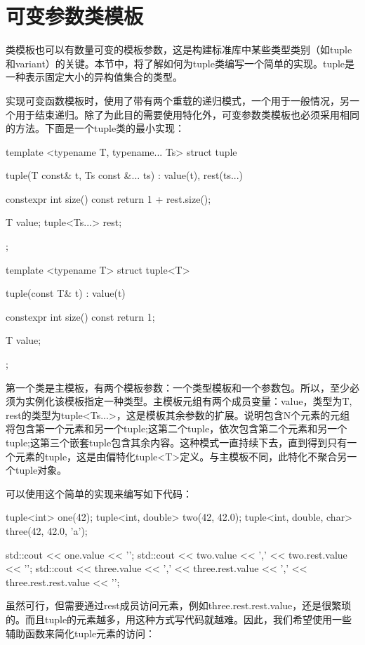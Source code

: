 \section{可变参数类模板}
类模板也可以有数量可变的模板参数，这是构建标准库中某些类型类别（如tuple和variant）的关键。本节中，将了解如何为tuple类编写一个简单的实现。tuple是一种表示固定大小的异构值集合的类型。

实现可变函数模板时，使用了带有两个重载的递归模式，一个用于一般情况，另一个用于结束递归。除了为此目的需要使用特化外，可变参数类模板也必须采用相同的方法。下面是一个tuple类的最小实现：

\begin{cpp}
template <typename T, typename... Ts>
struct tuple
{
	tuple(T const& t, Ts const &... ts)
	: value(t), rest(ts...)
	{
	}

	constexpr int size() const { return 1 + rest.size(); }
	
	T value;
	tuple<Ts...> rest;
};

template <typename T>
struct tuple<T>
{
	tuple(const T& t)
	: value(t)
	{
	}

	constexpr int size() const { return 1; }
	
	T value;
};
\end{cpp}

第一个类是主模板，有两个模板参数：一个类型模板和一个参数包。所以，至少必须为实例化该模板指定一种类型。主模板元组有两个成员变量：value，类型为T, rest的类型为tuple<Ts...>，这是模板其余参数的扩展。说明包含N个元素的元组将包含第一个元素和另一个tuple;这第二个tuple，依次包含第二个元素和另一个tuple;这第三个嵌套tuple包含其余内容。这种模式一直持续下去，直到得到只有一个元素的tuple，这是由偏特化tuple<T>定义。与主模板不同，此特化不聚合另一个tuple对象。

可以使用这个简单的实现来编写如下代码：

\begin{cpp}
tuple<int> one(42);
tuple<int, double> two(42, 42.0);
tuple<int, double, char> three(42, 42.0, 'a');

std::cout << one.value << '\n';
std::cout << two.value << ','
          << two.rest.value << '\n';
std::cout << three.value << ','
          << three.rest.value << ','
          << three.rest.rest.value << '\n';
\end{cpp}

虽然可行，但需要通过rest成员访问元素，例如three.rest.rest.value，还是很繁琐的。而且tuple的元素越多，用这种方式写代码就越难。因此，我们希望使用一些辅助函数来简化tuple元素的访问：

